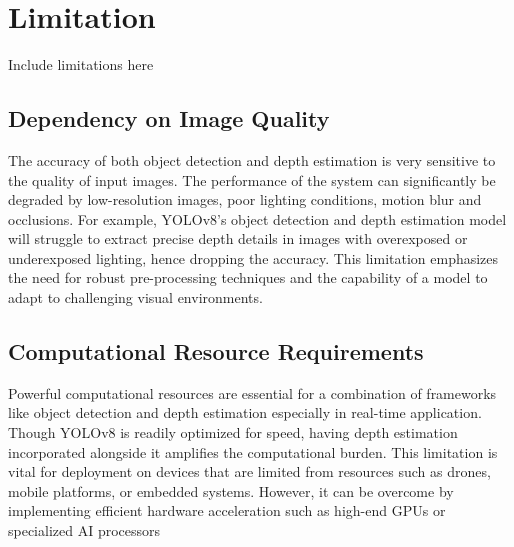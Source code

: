 \section{Limitation}
Include limitations here

\subsection{Dependency on Image Quality}
The accuracy of both object detection and depth estimation is very sensitive to the quality of input images. The performance of the system can significantly be degraded by low-resolution images, poor lighting conditions, motion blur and occlusions. For example, YOLOv8’s object detection and depth estimation model will struggle to extract precise depth details in images with overexposed or underexposed lighting, hence dropping the accuracy. This limitation emphasizes the need for robust pre-processing techniques and the capability of a model to adapt to challenging visual environments.

\subsection{Computational Resource Requirements}
Powerful computational resources are essential for a combination of frameworks like object detection and depth estimation especially in real-time application. Though YOLOv8 is readily optimized for speed, having depth estimation incorporated alongside it amplifies the computational burden. This limitation is vital for deployment on devices that are limited from resources such as drones, mobile platforms, or embedded systems. However, it can be overcome by implementing efficient hardware acceleration such as high-end GPUs or specialized AI processors
